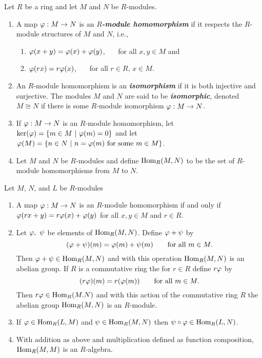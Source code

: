 \nl

\begin{defn}
Let $R$ be a ring and let $M$ and $N$ be $R$-modules.
\begin{enumerate}
\item A map $\varphi: M\rightarrow N$ is an $R$\textbf{\textit{-module homomorphism}} if it respects the $R$-module structures of $M$ and $N$, i.e.,
\begin{enumerate}
\item $\varphi(x + y) = \varphi(x) + \varphi(y)$, \ \ \ for all $x,y\in M$ and
\item $\varphi(rx) = r\varphi(x)$, \ \ \ for all $r\in R$, $x\in M$.
\end{enumerate}
\item An $R$-module homomorphism is an \textbf{\textit{isomorphism}} if it is both injective and surjective. The modules $M$ and $N$ are said to be \textbf{\textit{isomorphic}}, denoted $M\cong N$ if there is some $R$-module isomorphism $\varphi: M\rightarrow N$.
\item If $\varphi:M\rightarrow N$ is an $R$-module homomorphism, let $\ker(\vphi) = \{m\in M\ |\ \vphi(m) = 0\}$ and let $\varphi(M) = \{n\in N\ |\ n = \varphi(m)\text{ for some } m\in M\}$.
\item Let $M$ and $N$ be $R$-modules and define $\text{Hom}_R(M,N)$ to be the set of $R$-module homomorphisms from $M$ to $N$.
\end{enumerate}
\end{defn}

\nl

\begin{prop}
Let $M$, $N$, and $L$ be $R$-modules
\begin{enumerate}
\item A map $\varphi: M\rightarrow N$ is an $R$-module homomorphism if and only if $\varphi(rx + y) = r\varphi(x) + \varphi(y)$ for all $x,y\in M$ and $r\in R$.
\item Let $\varphi,\ \psi$ be elements of $\text{Hom}_R(M,N)$. Define $\varphi + \psi $ by
\[(\varphi + \psi)(m) = \varphi(m) + \psi(m)\qquad\text{for all } m\in M.\]
Then $\varphi + \psi\in \text{Hom}_R(M,N)$ and with this operation $\text{Hom}_R(M,N)$ is an abelian group. If $R$ is a commutative ring the for $r\in R$ define $r\varphi$ by 
\[(r\varphi)(m) = r(\varphi(m))\qquad\text{for all } m\in M.\]
Then $r\varphi\in\text{Hom}_R(M.N)$ and with this action of the commutative ring $R$ the abelian group $\text{Hom}_R(M,N)$ is an $R$-module.
\item If $\varphi\in\text{Hom}_R(L,M)$ and $\psi\in\text{Hom}_R(M,N)$ then $\psi\circ\varphi\in\text{Hom}_R(L,N)$.
\item With addition as above and multiplication defined as function composition, $\text{Hom}_R(M,M)$ is an $R$-algebra.
\end{enumerate}
\end{prop}

